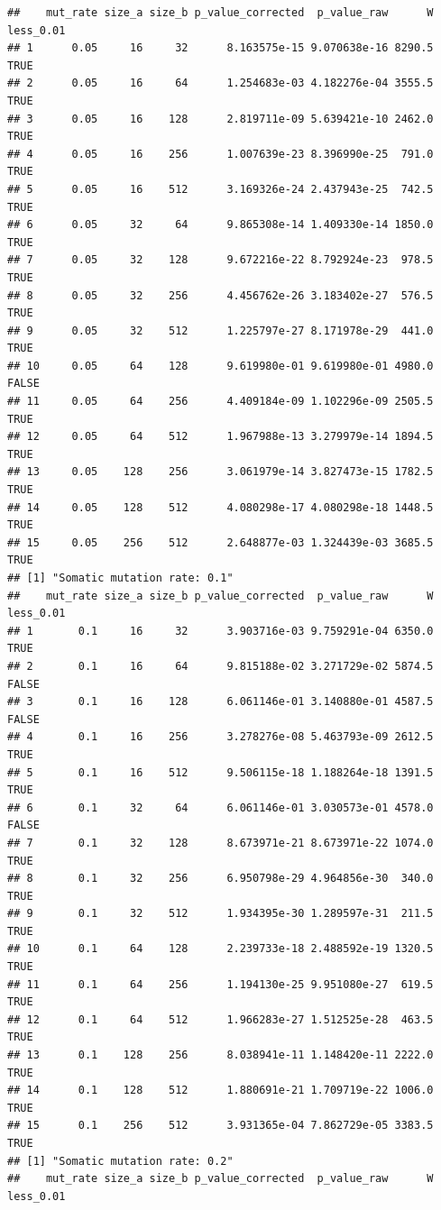 \documentclass[
]{book}
\begin{document}
\begin{verbatim}
##    mut_rate size_a size_b p_value_corrected  p_value_raw      W less_0.01
## 1      0.05     16     32      8.163575e-15 9.070638e-16 8290.5      TRUE
## 2      0.05     16     64      1.254683e-03 4.182276e-04 3555.5      TRUE
## 3      0.05     16    128      2.819711e-09 5.639421e-10 2462.0      TRUE
## 4      0.05     16    256      1.007639e-23 8.396990e-25  791.0      TRUE
## 5      0.05     16    512      3.169326e-24 2.437943e-25  742.5      TRUE
## 6      0.05     32     64      9.865308e-14 1.409330e-14 1850.0      TRUE
## 7      0.05     32    128      9.672216e-22 8.792924e-23  978.5      TRUE
## 8      0.05     32    256      4.456762e-26 3.183402e-27  576.5      TRUE
## 9      0.05     32    512      1.225797e-27 8.171978e-29  441.0      TRUE
## 10     0.05     64    128      9.619980e-01 9.619980e-01 4980.0     FALSE
## 11     0.05     64    256      4.409184e-09 1.102296e-09 2505.5      TRUE
## 12     0.05     64    512      1.967988e-13 3.279979e-14 1894.5      TRUE
## 13     0.05    128    256      3.061979e-14 3.827473e-15 1782.5      TRUE
## 14     0.05    128    512      4.080298e-17 4.080298e-18 1448.5      TRUE
## 15     0.05    256    512      2.648877e-03 1.324439e-03 3685.5      TRUE
## [1] "Somatic mutation rate: 0.1"
##    mut_rate size_a size_b p_value_corrected  p_value_raw      W less_0.01
## 1       0.1     16     32      3.903716e-03 9.759291e-04 6350.0      TRUE
## 2       0.1     16     64      9.815188e-02 3.271729e-02 5874.5     FALSE
## 3       0.1     16    128      6.061146e-01 3.140880e-01 4587.5     FALSE
## 4       0.1     16    256      3.278276e-08 5.463793e-09 2612.5      TRUE
## 5       0.1     16    512      9.506115e-18 1.188264e-18 1391.5      TRUE
## 6       0.1     32     64      6.061146e-01 3.030573e-01 4578.0     FALSE
## 7       0.1     32    128      8.673971e-21 8.673971e-22 1074.0      TRUE
## 8       0.1     32    256      6.950798e-29 4.964856e-30  340.0      TRUE
## 9       0.1     32    512      1.934395e-30 1.289597e-31  211.5      TRUE
## 10      0.1     64    128      2.239733e-18 2.488592e-19 1320.5      TRUE
## 11      0.1     64    256      1.194130e-25 9.951080e-27  619.5      TRUE
## 12      0.1     64    512      1.966283e-27 1.512525e-28  463.5      TRUE
## 13      0.1    128    256      8.038941e-11 1.148420e-11 2222.0      TRUE
## 14      0.1    128    512      1.880691e-21 1.709719e-22 1006.0      TRUE
## 15      0.1    256    512      3.931365e-04 7.862729e-05 3383.5      TRUE
## [1] "Somatic mutation rate: 0.2"
##    mut_rate size_a size_b p_value_corrected  p_value_raw      W less_0.01

\end{verbatim}
\end{document}
